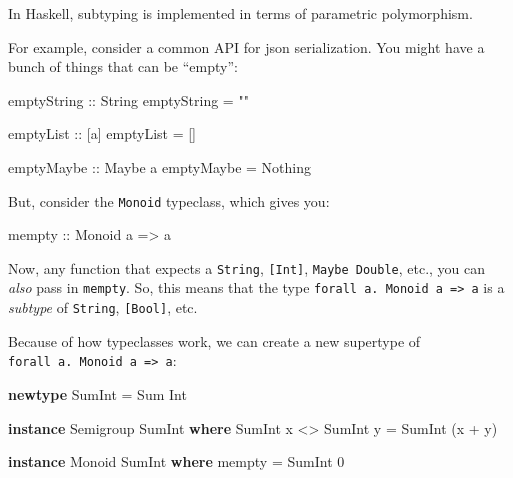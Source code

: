 \documentclass[]{article}
\newenvironment{Shaded}{}{}
\newcommand{\DataTypeTok}[1]{\textcolor[rgb]{0.56,0.13,0.00}{#1}}
\newcommand{\DecValTok}[1]{\textcolor[rgb]{0.25,0.63,0.44}{#1}}
\newcommand{\FunctionTok}[1]{\textcolor[rgb]{0.02,0.16,0.49}{#1}}
\newcommand{\KeywordTok}[1]{\textcolor[rgb]{0.00,0.44,0.13}{\textbf{#1}}}
\newcommand{\NormalTok}[1]{#1}
\newcommand{\OperatorTok}[1]{\textcolor[rgb]{0.40,0.40,0.40}{#1}}
\newcommand{\OtherTok}[1]{\textcolor[rgb]{0.00,0.44,0.13}{#1}}
\newcommand{\StringTok}[1]{\textcolor[rgb]{0.25,0.44,0.63}{#1}}
\begin{document}
In Haskell, subtyping is implemented in terms of parametric polymorphism.

For example, consider a common API for json serialization. You might have a
bunch of things that can be ``empty'':

\begin{Shaded}
\begin{Highlighting}[]
\OtherTok{emptyString ::} \DataTypeTok{String}
\NormalTok{emptyString }\OtherTok{=} \StringTok{""}

\OtherTok{emptyList ::}\NormalTok{ [a]}
\NormalTok{emptyList }\OtherTok{=}\NormalTok{ []}

\OtherTok{emptyMaybe ::} \DataTypeTok{Maybe}\NormalTok{ a}
\NormalTok{emptyMaybe }\OtherTok{=} \DataTypeTok{Nothing}
\end{Highlighting}
\end{Shaded}

But, consider the \texttt{Monoid} typeclass, which gives you:

\begin{Shaded}
\begin{Highlighting}[]
\FunctionTok{mempty}\OtherTok{ ::} \DataTypeTok{Monoid}\NormalTok{ a }\OtherTok{=\textgreater{}}\NormalTok{ a}
\end{Highlighting}
\end{Shaded}

Now, any function that expects a \texttt{String}, \texttt{{[}Int{]}},
\texttt{Maybe\ Double}, etc., you can \emph{also} pass in \texttt{mempty}. So,
this means that the type \texttt{forall\ a.\ Monoid\ a\ =\textgreater{}\ a} is a
\emph{subtype} of \texttt{String}, \texttt{{[}Bool{]}}, etc.

Because of how typeclasses work, we can create a new supertype of
\texttt{forall\ a.\ Monoid\ a\ =\textgreater{}\ a}:

\begin{Shaded}
\begin{Highlighting}[]
\KeywordTok{newtype} \DataTypeTok{SumInt} \OtherTok{=} \DataTypeTok{Sum} \DataTypeTok{Int}

\KeywordTok{instance} \DataTypeTok{Semigroup} \DataTypeTok{SumInt} \KeywordTok{where}
    \DataTypeTok{SumInt}\NormalTok{ x }\OperatorTok{\textless{}\textgreater{}} \DataTypeTok{SumInt}\NormalTok{ y }\OtherTok{=} \DataTypeTok{SumInt}\NormalTok{ (x }\OperatorTok{+}\NormalTok{ y)}

\KeywordTok{instance} \DataTypeTok{Monoid} \DataTypeTok{SumInt} \KeywordTok{where}
    \FunctionTok{mempty} \OtherTok{=} \DataTypeTok{SumInt} \DecValTok{0}
\end{Highlighting}
\end{Shaded}
\end{document}
